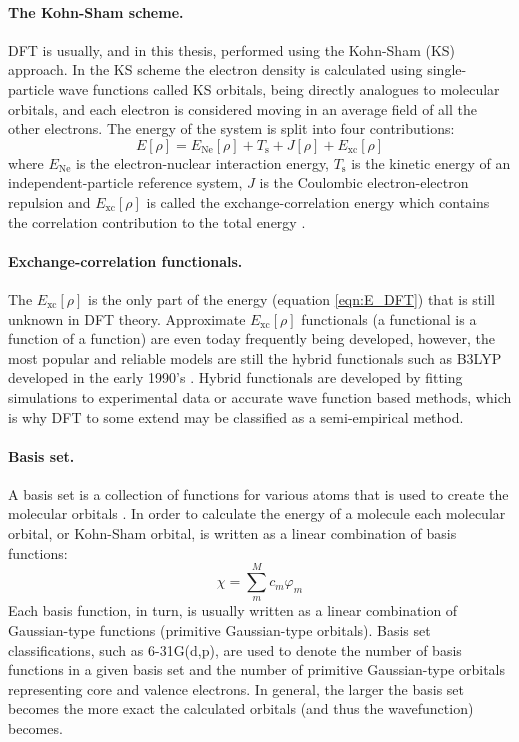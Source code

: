  \paragraph{The Kohn-Sham scheme.} DFT is usually, and in this thesis, performed using the Kohn-Sham (KS) approach. In the KS scheme the electron density is calculated using single-particle wave functions called KS orbitals, being directly analogues to molecular orbitals, and each electron is considered moving in an average field of all the other electrons. The energy of the system is split into four contributions:
\begin{equation}
 E[\rho] = E_\mathrm{Ne}[\rho] + T_\mathrm{s} + J[\rho] + E_\mathrm{xc}[\rho]
 \label{eqn:E_DFT}
\end{equation}
 where $E_\mathrm{Ne}$ is the electron-nuclear interaction energy, $T_\mathrm{s}$ is the kinetic energy of an independent-particle reference system, $J$ is the Coulombic electron-electron repulsion and $E_\mathrm{xc}[\rho]$ is called the exchange-correlation energy which contains the correlation contribution to the total energy \cite{Kohn1965}.

 \paragraph{Exchange-correlation functionals.} The $E_\mathrm{xc}[\rho]$ is the only part of the energy (equation \ref{eqn:E_DFT}) that is still unknown in DFT theory. Approximate $E_\mathrm{xc}[\rho]$ functionals (a functional is a function of a function) are even today frequently being developed, however, the most popular and reliable models are still the hybrid functionals such as B3LYP developed in the early 1990's \cite{Becke1993,Lee1988,Stephens1994}. Hybrid functionals are developed by fitting simulations to experimental data or accurate wave function based methods, which is why DFT to some extend may be classified as a semi-empirical method.

 \paragraph{Basis set.} A basis set is a collection of functions for various atoms that is used to create the molecular orbitals \cite{FrankJensenCC}. In order to calculate the energy of a molecule each molecular orbital, or Kohn-Sham orbital, is written as a linear combination of basis functions:
\begin{equation}
 \chi = \sum_m^M c_m\varphi_m
\end{equation}
 Each basis function, in turn, is usually written as a linear combination of Gaussian-type functions (primitive Gaussian-type orbitals). Basis set classifications, such as 6-31G(d,p), are used to denote the number of basis functions in a given basis set and the number of primitive Gaussian-type orbitals representing core and valence electrons. In general, the larger the basis set becomes the more exact the calculated orbitals (and thus the wavefunction) becomes.

